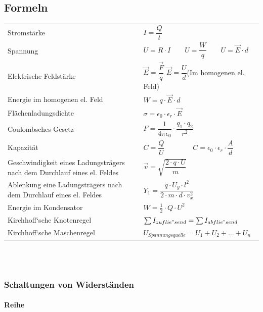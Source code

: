 \documentclass[a4paper]{article}
\begin{document}
\subsection{Formeln}

\renewcommand{\arraystretch}{4}
\begin{tabular}{p{6cm} p{10cm}}
	Stromstärke																	& $I = \dfrac{Q}{t}$\\
	Spannung																	& $U = R \cdot I  \qquad U = \dfrac{W}{q}  \qquad U = \vec{E} \cdot d$\\
	Elektrische Feldstärke														& $\vec{E} = \dfrac{\vec{F}}{q}$ \qquad $\vec{E} = \dfrac{U}{d}$\qquad \small(Im homogenen el. Feld)\\
	Energie im homogenen el. Feld												& $W = q \cdot \vec{E} \cdot d$\\
	Flächenladungsdichte														& $\sigma = \epsilon_0 \cdot \epsilon_r \cdot \vec{E}$\\
	Coulombsches Gesetz															& $F = \dfrac{1}{4 \pi \epsilon_0} \cdot \dfrac{q_1 \cdot q_2}{r^2}$\\
	Kapazität																	& $C = \dfrac{Q}{U} \qquad\qquad C = \epsilon_0 \cdot \epsilon_r \cdot \dfrac{A}{d}$\\
	Geschwindigkeit eines Ladungsträgers nach dem Durchlauf eines el. Feldes	& $\vec{v} = \sqrt{\dfrac{2 \cdot q \cdot U}{m}}$\\
	Ablenkung eine Ladungsträgers nach dem Durchlauf eines el. Feldes			& $Y_1 = \dfrac{q \cdot U_y \cdot l^2}{2 \cdot m \cdot d \cdot v_x ^2}$\\
	Energie im Kondensator														& $W = \frac{1}{2} \cdot Q \cdot U^2$\\
	Kirchhoff‘sche Knotenregel													& $\sum{I_{zuflie"send}} = \sum{I_{abflie"send}}$\\
	Kirchhoff‘sche Maschenregel													& $U_{Spannungsquelle} = U_1  +  U_2 + \dots + U_n$\\
\end{tabular}
\renewcommand{\arraystretch}{1} \\\\



\subsubsection{Schaltungen von Widerständen}
\paragraph{Reihe}
\end{document}
